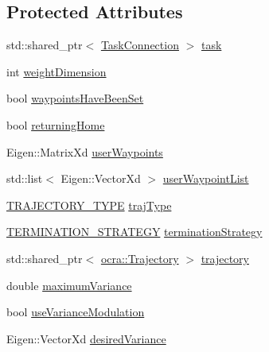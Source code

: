 \subsection*{Protected Attributes}
\begin{DoxyCompactItemize}
\item 
std\+::shared\+\_\+ptr$<$ \hyperlink{classocra__recipes_1_1TaskConnection}{Task\+Connection} $>$ \hyperlink{classocra__recipes_1_1TrajectoryThread_a3637e00b27ab63ecc48f813013626cba}{task}
\item 
int \hyperlink{classocra__recipes_1_1TrajectoryThread_a32ee7b3f9364768200a460283f7be5ef}{weight\+Dimension}
\item 
bool \hyperlink{classocra__recipes_1_1TrajectoryThread_a35b51009ac64e577770b0e728846c4c4}{waypoints\+Have\+Been\+Set}
\item 
bool \hyperlink{classocra__recipes_1_1TrajectoryThread_a3835f5a143e350d53786d4469fce09f1}{returning\+Home}
\item 
Eigen\+::\+Matrix\+Xd \hyperlink{classocra__recipes_1_1TrajectoryThread_a54a762b3cdd7330322b39f288deda6a9}{user\+Waypoints}
\item 
std\+::list$<$ Eigen\+::\+Vector\+Xd $>$ \hyperlink{classocra__recipes_1_1TrajectoryThread_ab0d6ab656c8e4c7abd3bae0343b51562}{user\+Waypoint\+List}
\item 
\hyperlink{namespaceocra__recipes_a729e1c8304e390d16219eda5f9756152}{T\+R\+A\+J\+E\+C\+T\+O\+R\+Y\+\_\+\+T\+Y\+PE} \hyperlink{classocra__recipes_1_1TrajectoryThread_a1ed2999782ff98b02b5d99ac66766cd7}{traj\+Type}
\item 
\hyperlink{namespaceocra__recipes_afcf7ca623a6c39b246aa4bda629c7309}{T\+E\+R\+M\+I\+N\+A\+T\+I\+O\+N\+\_\+\+S\+T\+R\+A\+T\+E\+GY} \hyperlink{classocra__recipes_1_1TrajectoryThread_a3bbd0bd08a9ad023c025722486b1c118}{termination\+Strategy}
\item 
std\+::shared\+\_\+ptr$<$ \hyperlink{classocra_1_1Trajectory}{ocra\+::\+Trajectory} $>$ \hyperlink{classocra__recipes_1_1TrajectoryThread_a87ec388c22716d82bca31dbf89a21cb3}{trajectory}
\item 
double \hyperlink{classocra__recipes_1_1TrajectoryThread_a16c8d8bfbbfb45b1a3fa9b08781123aa}{maximum\+Variance}
\item 
bool \hyperlink{classocra__recipes_1_1TrajectoryThread_a963041d784e1078db6a3095a0438a129}{use\+Variance\+Modulation}
\item 
Eigen\+::\+Vector\+Xd \hyperlink{classocra__recipes_1_1TrajectoryThread_a86a09c83fbbf2b7a22469a3476204b24}{desired\+Variance}

\end{DoxyCompactItemize}
